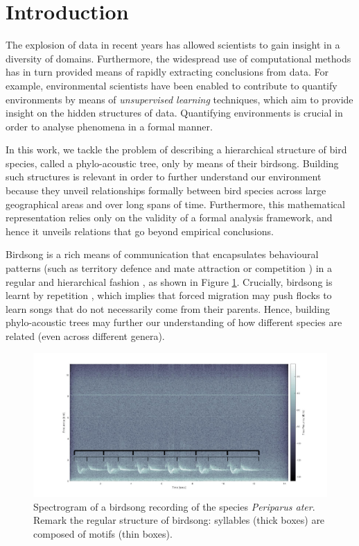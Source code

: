 \documentclass[pdftex,11pt,a4paper]{article}
\theoremstyle{definition}
\theoremstyle{remark}
\begin{document}
\section{Introduction}
\label{section_introduction}
The explosion of data in recent years has allowed scientists to gain insight in a diversity of domains. Furthermore, the widespread use of computational methods has in turn provided means of rapidly extracting conclusions from data. For example, environmental scientists have been enabled to contribute to quantify environments by means of \emph{unsupervised learning} techniques, which aim to provide insight on the hidden structures of data. Quantifying environments is crucial in order to analyse phenomena in a formal manner.
\par In this work, we tackle the problem of describing a hierarchical structure of bird species, called a phylo-acoustic tree, only by means of their birdsong. Building such structures is relevant in order to further understand our environment because they unveil relationships formally between bird species across large geographical areas and over long spans of time. Furthermore, this mathematical representation relies only on the validity of a formal analysis framework, and hence it unveils relations that go beyond empirical conclusions. 
\par Birdsong is a rich means of communication that encapsulates behavioural patterns (such as territory defence and mate attraction or competition \cite{Berwick2013, Naguib2014}) in a regular and hierarchical fashion \cite{Snowdon2013}, as shown in Figure \ref{fig_birdsong_structure}. Crucially, birdsong is learnt by repetition \cite{Berwick2013}, which implies that forced migration may push flocks to learn songs that do not necessarily come from their parents. Hence, building phylo-acoustic trees may further our understanding of how different species are related (even across different genera).
\begin{figure}[t]
\centering
\includegraphics[width=\textwidth]{images/birdsong_structure}
\caption{Spectrogram of a birdsong recording of the species \emph{Periparus ater}. Remark the regular structure of birdsong: syllables (thick boxes) are composed of motifs (thin boxes).}
\label{fig_birdsong_structure}
\end{figure}
\end{document}
